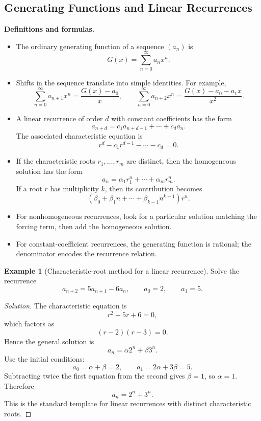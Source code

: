 \documentclass[11pt]{article}
\theoremstyle{definition}
\newtheorem{example}{Example}[section]
\begin{document}
\subsection{Generating Functions and Linear Recurrences}
\textbf{Definitions and formulas.}
\begin{itemize}
    \item The ordinary generating function of a sequence $(a_n)$ is
    \[
        G(x)=\sum_{n=0}^{\infty} a_n x^n.
    \]
    \item Shifts in the sequence translate into simple identities. For example,
    \[
        \sum_{n=0}^{\infty} a_{n+1}x^n = \frac{G(x)-a_0}{x},
        \qquad
        \sum_{n=0}^{\infty} a_{n+2}x^n = \frac{G(x)-a_0-a_1x}{x^2}.
    \]
    \item A linear recurrence of order $d$ with constant coefficients has the form
    \[
        a_{n+d}=c_1a_{n+d-1}+\cdots+c_da_n.
    \]
    The associated characteristic equation is
    \[
        r^d-c_1r^{d-1}-\cdots-c_d=0.
    \]
    \item If the characteristic roots $r_1,\dots,r_m$ are distinct, then the homogeneous solution has the form
    \[
        a_n=\alpha_1 r_1^n + \cdots + \alpha_m r_m^n.
    \]
    If a root $r$ has multiplicity $k$, then its contribution becomes
    \[
        (\beta_0+\beta_1 n+\cdots+\beta_{k-1}n^{k-1})r^n.
    \]
    \item For nonhomogeneous recurrences, look for a particular solution matching the forcing term, then add the homogeneous solution.
    \item For constant-coefficient recurrences, the generating function is rational; the denominator encodes the recurrence relation.
\end{itemize}

\begin{example}[Characteristic-root method for a linear recurrence]
Solve the recurrence
\[
a_{n+2}=5a_{n+1}-6a_n, \qquad a_0=2, \qquad a_1=5.
\]
\end{example}

\begin{proof}[Solution]
The characteristic equation is
\[
r^2-5r+6=0,
\]
which factors as
\[
(r-2)(r-3)=0.
\]
Hence the general solution is
\[
a_n=\alpha 2^n + \beta 3^n.
\]
Use the initial conditions:
\[
a_0=\alpha+\beta=2,
\qquad
a_1=2\alpha+3\beta=5.
\]
Subtracting twice the first equation from the second gives $\beta=1$, so $\alpha=1$. Therefore
\[
\boxed{a_n=2^n+3^n}.
\]
This is the standard template for linear recurrences with distinct characteristic roots.
\end{proof}
\end{document}
